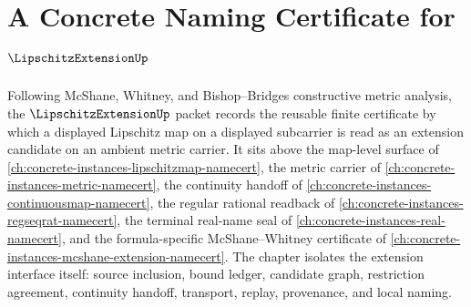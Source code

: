 \chapter{A Concrete Naming Certificate for $\LipschitzExtensionUp$}
\label{ch:concrete-instances-lipschitz-extension-namecert}

Following McShane, Whitney, and Bishop--Bridges constructive metric analysis, the $\LipschitzExtensionUp$ packet records the reusable finite certificate by which a displayed Lipschitz map on a displayed subcarrier is read as an extension candidate on an ambient metric carrier. It sits above the map-level surface of \autoref{ch:concrete-instances-lipschitzmap-namecert}, the metric carrier of \autoref{ch:concrete-instances-metric-namecert}, the continuity handoff of \autoref{ch:concrete-instances-continuousmap-namecert}, the regular rational readback of \autoref{ch:concrete-instances-regseqrat-namecert}, the terminal real-name seal of \autoref{ch:concrete-instances-real-namecert}, and the formula-specific McShane--Whitney certificate of \autoref{ch:concrete-instances-mcshane-extension-namecert}. The chapter isolates the extension interface itself: source inclusion, bound ledger, candidate graph, restriction agreement, continuity handoff, transport, replay, provenance, and local naming.

